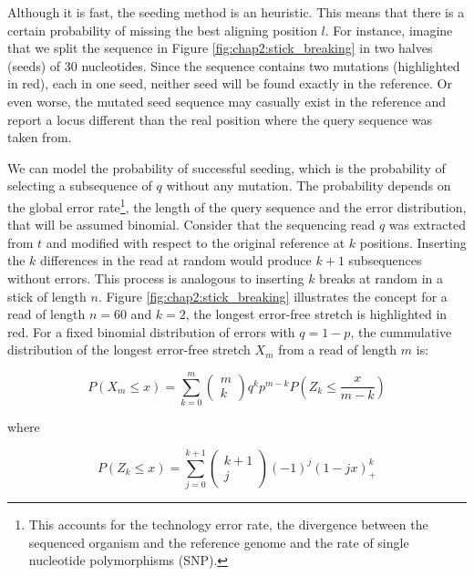 Although it is fast, the seeding method is an heuristic. This means
that there is a certain probability of missing the best aligning
position $l$. For instance, imagine that we split the sequence in
Figure \ref{fig:chap2:stick_breaking} in two halves (seeds) of 30
nucleotides. Since the sequence contains two mutations (highlighted in
red), each in one seed, neither seed will be found exactly in the
reference. Or even worse, the mutated seed sequence may casually exist
in the reference and report a locus different than the real position
where the query sequence was taken from.

We can model the probability of successful seeding, which is the
probability of selecting a subsequence of $q$ without any
mutation. The probability depends on the global error
rate\footnote{This accounts for the technology error rate, the 
  divergence between the sequenced organism and the reference genome
  and the rate of single nucleotide polymorphisms (SNP).},
the length of the query sequence and the error distribution, that will
be assumed binomial. Consider that the sequencing read $q$ was extracted
from $t$ and modified with respect to the original reference at $k$
positions. Inserting the $k$ differences in the read at random would
produce $k+1$ subsequences without errors. This process is analogous
to inserting $k$ breaks at random in a stick of length $n$. Figure
\ref{fig:chap2:stick_breaking} illustrates the concept for a read of
length $n=60$ and $k=2$, the longest error-free stretch is highlighted
in red. For a fixed binomial distribution of errors with $q=1-p$, the
cummulative distribution of the longest error-free stretch $X_m$ from
a read of length $m$ is: 

\begin{equation}
\label{eq:chap2:longest-run}
  P(X_m \leq x) = \sum_{k=0}^{m}
  \left( \begin{array}{c}
    m \\ k
  \end{array}
  \right)
  q^k p^{m-k} P \left(
  Z_k \leq \frac{x}{m-k}
  \right)
\end{equation}

where

\begin{equation}
  P (Z_k \leq x) = \sum_{j=0}^{k+1}
  \left( \begin{array}{c}
    k+1 \\ j
  \end{array} \right)
  (-1)^j(1-jx)^k_+
\end{equation}

